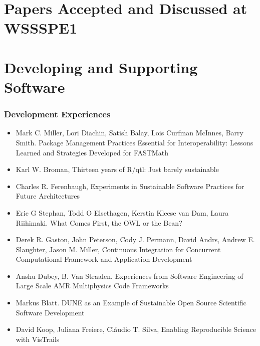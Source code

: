 \documentclass[11pt, oneside]{amsart}
\begin{document}
\appendix
\section{Papers Accepted and Discussed at WSSSPE1} \label{sec:papers}

\section*{Developing and Supporting Software}

\subsubsection*{Development Experiences}

\begin{itemize}

\item Mark C. Miller, Lori Diachin, Satish Balay, Lois Curfman
  McInnes, Barry Smith. Package Management Practices Essential for
  Interoperability: Lessons Learned and Strategies Developed for
  FASTMath~\cite{Miller_WSSSPE}

\item Karl W. Broman, Thirteen years of R/qtl: Just barely sustainable~\cite{Broman_WSSSPE}

\item Charles R. Ferenbaugh, Experiments in Sustainable Software
  Practices for Future Architectures~\cite{Ferenbaugh_WSSSPE}

\item Eric G Stephan, Todd O Elsethagen, Kerstin Kleese van Dam, Laura
  Riihimaki. What Comes First, the OWL or the Bean?~\cite{Stephan_WSSSPE}

\item Derek R. Gaston, John Peterson, Cody J. Permann, David Andrs,
  Andrew E. Slaughter, Jason M. Miller, Continuous Integration for
  Concurrent Computational Framework and Application Development~\cite{Gaston_WSSSPE}

\item Anshu Dubey, B. Van Straalen. Experiences from Software
  Engineering of Large Scale AMR Multiphysics Code Frameworks~\cite{Dubey_WSSSPE}

\item Markus Blatt. DUNE as an Example of Sustainable Open Source
  Scientific Software Development~\cite{Blatt_WSSSPE}

\item David Koop, Juliana Freiere, Cl\'{a}udio T. Silva, Enabling
  Reproducible Science with VisTrails~\cite{Koop_WSSSPE}


\end{itemize}
\end{document}
